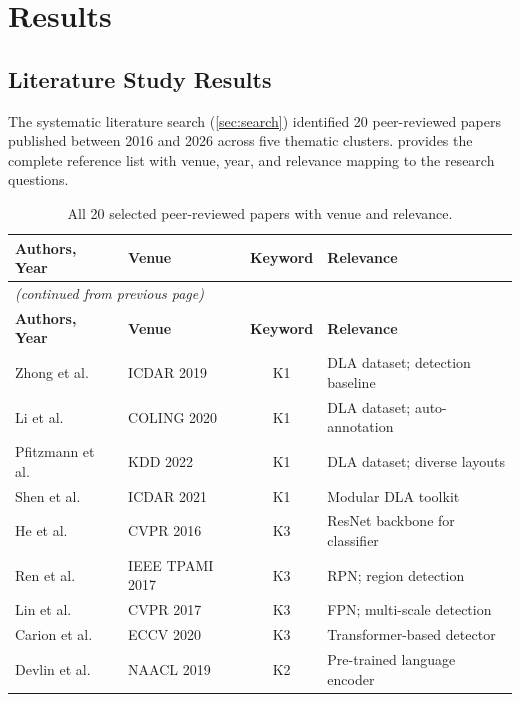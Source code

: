 \chapter{Results}
\label{ch:results}

\section{Literature Study Results}
\label{sec:lit_results}

The systematic literature search (\cref{sec:search}) identified 20 peer-reviewed papers
published between 2016 and 2026 across five thematic clusters. 
provides the complete reference list with venue, year, and relevance mapping to the
research questions.

\begin{longtable}{p{5.2cm}p{3.8cm}cp{2.8cm}}
\caption{All 20 selected peer-reviewed papers with venue and relevance.}
\label{tab:lit_20}\\
\toprule
\textbf{Authors, Year} & \textbf{Venue} & \textbf{Keyword} & \textbf{Relevance} \\
\midrule
\endfirsthead
\multicolumn{4}{l}{\small\textit{(continued from previous page)}} \\
\toprule
\textbf{Authors, Year} & \textbf{Venue} & \textbf{Keyword} & \textbf{Relevance} \\
\midrule
\endhead
\bottomrule
\endfoot
Zhong et al.~\cite{zhong2019publaynet}        & ICDAR 2019 & K1 & DLA dataset; detection baseline \\
Li et al.~\cite{li2020docbank}                & COLING 2020 & K1 & DLA dataset; auto-annotation \\
Pfitzmann et al.~\cite{pfitzmann2022doclaynet}& KDD 2022 & K1 & DLA dataset; diverse layouts \\
Shen et al.~\cite{shen2021layoutparser}       & ICDAR 2021 & K1 & Modular DLA toolkit \\
He et al.~\cite{he2016resnet}                 & CVPR 2016 & K3 & ResNet backbone for classifier \\
Ren et al.~\cite{ren2017fasterrcnn}           & IEEE TPAMI 2017 & K3 & RPN; region detection \\
Lin et al.~\cite{lin2017fpn}                  & CVPR 2017 & K3 & FPN; multi-scale detection \\
Carion et al.~\cite{carion2020detr}           & ECCV 2020 & K3 & Transformer-based detector \\
Devlin et al.~\cite{devlin2019bert}           & NAACL 2019 & K2 & Pre-trained language encoder \\

\end{longtable}
